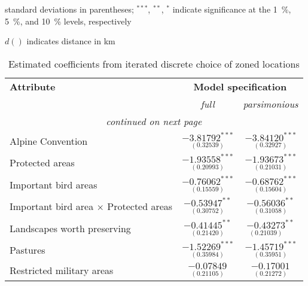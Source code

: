 \begin{ThreePartTable}
 \renewcommand\TPTminimum{\textwidth}
    \begin{TableNotes}
        \footnotesize
        \item standard deviations in parentheses; $^{***}$, $^{**}$, $^{*}$ indicate significance at the \SI{1}{\percent}, \SI{5}{\percent}, and \SI{10}{\percent} levels, respectively
        \item $d()$ indicates distance in km
    \end{TableNotes}
        
    \begin{longtable}{l c c}
        \caption{Estimated coefficients from iterated discrete choice of zoned locations} \label{tab:logitmodel}\\
        \toprule
         \textbf{Attribute}                           & \multicolumn{2}{c}{\textbf{Model specification}}\\ 
         & \emph{full}  & \emph{parsimonious}\\
        \midrule
        \endhead
        \midrule
        \multicolumn{3}{c}{\textit{continued on next page}} 
        \endfoot
        \bottomrule
        \insertTableNotes
        \endlastfoot
         Airports                                     & $\underset{(0.36230)}{-2.53286^{***}}$ & $\underset{(0.36666)}{-2.53318^{***}}$ \\
         Alpine Convention                            & $\underset{(0.32539)}{-3.81792^{***}}$ & $\underset{(0.32927)}{-3.84120^{***}}$ \\
         Protected areas                              & $\underset{(0.20993)}{-1.93558^{***}}$ & $\underset{(0.21031)}{-1.93673^{***}}$ \\
         Important bird areas                         & $\underset{(0.15559)}{-0.76062^{***}}$ & $\underset{(0.15604)}{-0.68762^{***}}$ \\
         Important bird area $\times$ Protected areas & $\underset{(0.30752)}{-0.53947^{**}}$  & $\underset{(0.31058)}{-0.56036^{**}}$  \\
         Landscapes worth preserving                  & $\underset{(0.21420)}{-0.41445^{**}}$  & $\underset{(0.21039)}{-0.43273}^{**}$  \\
         Pastures                                     & $\underset{(0.35984)}{-1.52269^{***}}$ & $\underset{(0.35951)}{-1.45719^{***}}$ \\
         Restricted military areas                    & $\underset{(0.21105)}{-0.07849^{}}$    & $\underset{(0.21272)}{-0.17001^{}}$    \\

\end{longtable}
\end{ThreePartTable}
